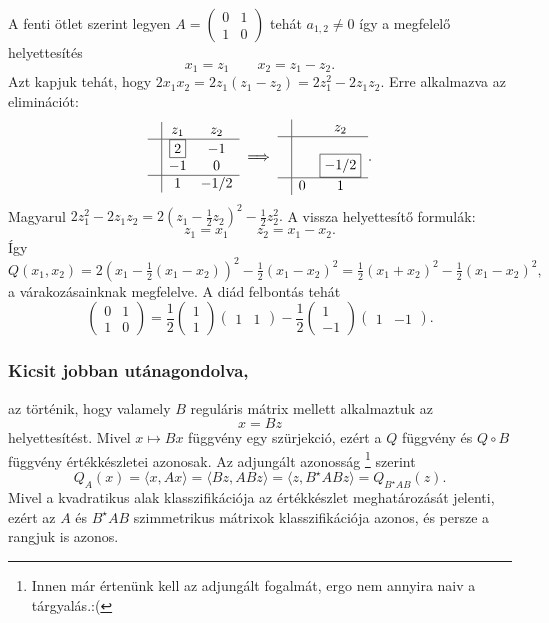 \documentclass[a4paper, showtrims]{memoir}
\theoremstyle{plain}
\theoremstyle{remark}
\theoremstyle{definition}
\newcommand{\ip}[2]{\langle#1,#2\rangle}
\begin{document}
A fenti ötlet szerint legyen 
$
A=
\begin{pmatrix}
    0&1\\1&0
\end{pmatrix}
$
tehát $a_{1,2}\neq 0$ így a megfelelő helyettesítés
\[
    x_1=z_1\qquad x_2=z_1-z_2.
\]
Azt kapjuk tehát, hogy 
\(
2x_1x_2=2z_1\left( z_1-z_2 \right)=2z_1^2-2z_1z_2.
\)
Erre alkalmazva az eliminációt:
\[
\begin{array}{c|cc}
     & z_1       & z_2\\
     \hline
     & \boxed{2} & -1 \\
     & -1         & 0 \\
    \hline
    & 1     & -1/2  
\end{array}
\implies
\begin{array}{c|cc}
     &  & z_2   \\
     \hline
     & &               \\
     & & \boxed{-1/2}   \\
     \hline
     &0 & 1 
\end{array}.
\]
Magyarul 
\(
2z_1^2-2z_1z_2=2\left( z_1-\frac{1}{2}z_2 \right)^2-\frac{1}{2}z_2^2.
\)
A vissza helyettesítő formulák:
\[
    z_1=x_1\qquad z_2=x_1-x_2.
\]
Így
\(
Q\left( x_1,x_2 \right)=
2\left( x_1-\frac{1}{2}\left( x_1-x_2 \right) \right)^2-\frac{1}{2}\left( x_1-x_2 \right)^2
=
\frac{1}{2}\left( x_1+x_2 \right)^2-\frac{1}{2}\left( x_1-x_2 \right)^2,
\)
a várakozásainknak megfelelve.
A diád felbontás tehát
\[
    \begin{pmatrix}
        0&1\\1&0
    \end{pmatrix}
    =\frac{1}{2}
    \begin{pmatrix}
        1\\1
    \end{pmatrix}
    \begin{pmatrix}
        1&1
    \end{pmatrix}
    -
    \frac{1}{2}
    \begin{pmatrix}
        1\\-1
    \end{pmatrix}
    \begin{pmatrix}
        1&-1
    \end{pmatrix}.
\]

\subsubsection{Kicsit jobban utánagondolva,}
az történik, hogy valamely $B$ reguláris mátrix mellett alkalmaztuk az 
\[
    x=Bz
\]
helyettesítést. 
Mivel $x\mapsto Bx$ függvény egy szürjekció, ezért a $Q$ függvény és $Q\circ B$ függvény értékkészletei azonosak.
Az adjungált azonosság%
\footnote{Innen már értenünk kell az adjungált fogalmát, ergo nem annyira naiv a tárgyalás.:(}
szerint
\[
    Q_A\left( x \right)
    =
    \ip{x}{Ax}
    =
    \ip{Bz}{ABz}
    =
    \ip{z}{B^\star ABz}
    =Q_{B^\star AB}\left( z \right).
\]
Mivel a kvadratikus alak klasszifikációja az értékkészlet meghatározását jelenti,
ezért az $A$ és $B^\star AB$ szimmetrikus mátrixok klasszifikációja azonos, és persze a rangjuk is azonos.
\end{document}
